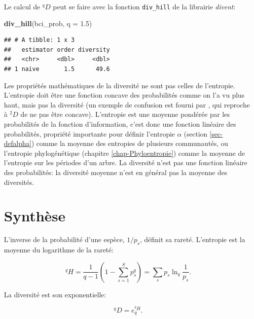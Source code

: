 \documentclass[
  11pt,
  american,
  a4paper,
  extrafontsizes,onecolumn,openright
  ]{memoir}
\newenvironment{Shaded}{\begin{snugshade}}{\end{snugshade}}
\newcommand{\AttributeTok}[1]{\textcolor[rgb]{0.13,0.29,0.53}{#1}}
\newcommand{\FloatTok}[1]{\textcolor[rgb]{0.00,0.00,0.81}{#1}}
\newcommand{\FunctionTok}[1]{\textcolor[rgb]{0.13,0.29,0.53}{\textbf{#1}}}
\newcommand{\NormalTok}[1]{#1}
\begin{document}
Le calcul de \(^{q}\!D\) peut se faire avec la fonction \texttt{div\_hill} de la librairie \emph{divent}:

\scriptsize

\begin{Shaded}
\begin{Highlighting}[]
\FunctionTok{div\_hill}\NormalTok{(bci\_prob, }\AttributeTok{q =} \FloatTok{1.5}\NormalTok{)}
\end{Highlighting}
\end{Shaded}

\begin{verbatim}
## # A tibble: 1 x 3
##   estimator order diversity
##   <chr>     <dbl>     <dbl>
## 1 naive       1.5      49.6
\end{verbatim}

\normalsize

Les propriétés mathématiques de la diversité ne sont pas celles de l'entropie.
L'entropie doit être une fonction concave des probabilités comme on l'a vu plus haut, mais pas la diversité (un exemple de confusion est fourni par \textcite{Gadagkar1989}, qui reproche à \(^{2}\!D\) de ne pas être concave).
L'entropie est une moyenne pondérée par les probabilités de la fonction d'information, c'est donc une fonction linéaire des probabilités, propriété importante pour définir l'entropie \(\alpha\) (section \ref{sec-defalpha}) comme la moyenne des entropies de plusieurs communautés, ou l'entropie phylogénétique (chapitre \ref{chap-Phyloentropie}) comme la moyenne de l'entropie sur les périodes d'un arbre.
La diversité n'est pas une fonction linéaire des probabilités: la diversité moyenne n'est en général pas la moyenne des diversités.

\section{Synthèse}\label{synthuxe8se-1}

L'inverse de la probabilité d'une espèce, \(1/p_s\), définit sa rareté.
L'entropie est la moyenne du logarithme de la rareté:

\begin{equation}
  \label{eq:EntropieRarete}
  ^{q}\!H 
  = \frac{1}{q-1} \left( 1 - \sum^S_{s=1}{p^q_s} \right)
  = \sum_s{p_s}\ln_q\frac{1}{p_s}.
\end{equation}

La diversité est son exponentielle:

\begin{equation}
  \label{eq:DexpHSynthese}
  ^{q}\!D = e_q^{^{q}\!H}.
\end{equation}
\end{document}
